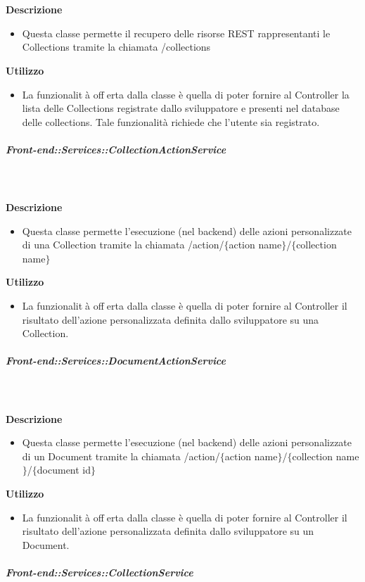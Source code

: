         \textbf{\\ \\ Descrizione} 
          \begin{itemize}
            \item[] Questa classe permette il recupero delle risorse REST rappresentanti le Collections tramite la chiamata /collections
          \end{itemize}      
        \textbf{Utilizzo}  
          \begin{itemize}
            \item[] La funzionalità offerta dalla classe è quella di poter fornire al Controller la lista delle Collections registrate dallo sviluppatore e presenti nel database delle collections.
Tale funzionalità richiede che l'utente sia registrato.
          \end{itemize}
      \subparagraph{Front-end::Services::CollectionActionService}
        
        \textbf{\\ \\ Descrizione} 
          \begin{itemize}
            \item[] Questa classe permette l'esecuzione (nel backend) delle azioni personalizzate di una Collection tramite la chiamata /action/$\{$action name$\}$/$\{$collection name$\}$
          \end{itemize}      
        \textbf{Utilizzo}  
          \begin{itemize}
            \item[] La funzionalità offerta dalla classe è quella di poter fornire al Controller il risultato dell'azione personalizzata definita dallo sviluppatore su una Collection.
          \end{itemize}
      \subparagraph{Front-end::Services::DocumentActionService}
        
        \textbf{\\ \\ Descrizione} 
          \begin{itemize}
            \item[] Questa classe permette l'esecuzione (nel backend) delle azioni personalizzate di un Document tramite la chiamata /action/$\{$action name$\}$/$\{$collection name$\}$/$\{$document id$\}$
          \end{itemize}      
        \textbf{Utilizzo}  
          \begin{itemize}
            \item[] La funzionalità offerta dalla classe è quella di poter fornire al Controller il risultato dell'azione personalizzata definita dallo sviluppatore su un Document.
          \end{itemize}
      \subparagraph{Front-end::Services::CollectionService}
        
